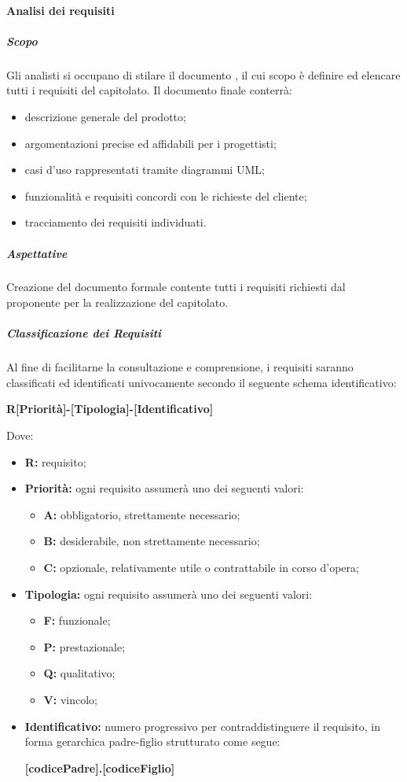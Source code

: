			\paragraph{Analisi dei requisiti}
				\subparagraph{Scopo}
					Gli analisti si occupano di stilare il documento , il cui scopo è definire ed elencare tutti i requisiti del capitolato. Il documento finale conterrà:
					\begin{itemize}
						\item descrizione generale del prodotto;
						\item argomentazioni precise ed affidabili per i progettisti;
						\item casi d'uso rappresentati tramite diagrammi UML;
						\item funzionalità e requisiti concordi con le richieste del cliente;
						\item tracciamento dei requisiti individuati.
					\end{itemize}
				\subparagraph{Aspettative}
					Creazione del documento formale contente tutti i requisiti richiesti dal proponente per la realizzazione del capitolato.
				\subparagraph{Classificazione dei Requisiti}
					Al fine di facilitarne la consultazione e comprensione, i requisiti saranno classificati ed identificati univocamente secondo il seguente schema identificativo:
					\begin{center}
						\textbf{R[Priorità]-[Tipologia]-[Identificativo]}
					\end{center}
					Dove:
					\begin{itemize}
						\item \textbf{R:} requisito;
						\item \textbf{Priorità:} ogni requisito assumerà uno dei seguenti valori:
						\begin{itemize}
							\item \textbf{A:} obbligatorio, strettamente necessario;
							\item \textbf{B:} desiderabile, non strettamente necessario;
							\item \textbf{C:} opzionale, relativamente utile o contrattabile in corso d'opera;
						\end{itemize}
						\item \textbf{Tipologia:} ogni requisito assumerà uno dei seguenti valori:
						\begin{itemize}
							\item \textbf{F:} funzionale;
							\item \textbf{P:} prestazionale;
							\item \textbf{Q:} qualitativo;
							\item \textbf{V:} vincolo;
						\end{itemize}
						\item \textbf{Identificativo:} numero progressivo per contraddistinguere il requisito, in forma gerarchica padre-figlio strutturato come segue:
						\begin{center}
							\textbf{[codicePadre].[codiceFiglio]}
						\end{center}
					\end{itemize}
